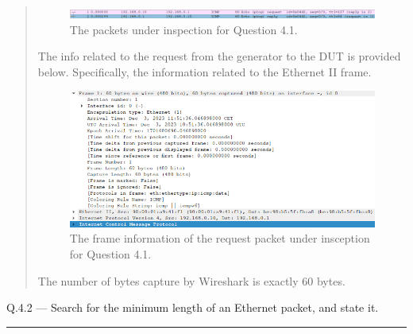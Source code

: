 \documentclass{article}
\newcommand\Que[2]{%
\begin{samepage}
\leavevmode\par
\noindent
Q.#1 --- #2\par\vspace{10pt}\hrule\vspace{10pt}
\end{samepage}}
\newenvironment{ans}
{\fbox{Answer}\begin{quote}\nopagebreak}
{\end{quote}}
\begin{document}
\begin{ans}
\begin{figure}[H]
\centering
\includegraphics[width=16cm]{data/q4.1-packets-under-inspection.png}
\caption{The packets under inspection for Question 4.1.}
\end{figure}

The info related to the request from the generator to the
DUT is provided below. Specifically, the information
related to the Ethernet II frame.

\begin{figure}[H]
\centering
\includegraphics[width=16cm]{data/q4.1-request-info.png}
\caption{The frame information of the request packet under
insception for Question 4.1.}
\end{figure}

The number of bytes capture by Wireshark is exactly 60
bytes.
\end{ans}

\Que{4.2}{Search for the minimum length of an Ethernet packet,
and state it.}
\end{document}
